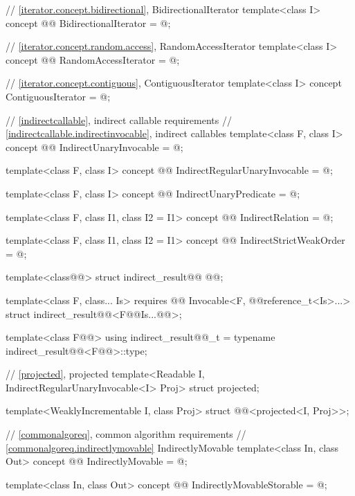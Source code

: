 \begin{addedblock}
\begin{codeblock}
  // \ref{iterator.concept.bidirectional}, BidirectionalIterator
  template<class I>
  concept @@ BidirectionalIterator = @\seebelownc@;

  // \ref{iterator.concept.random.access}, RandomAccessIterator
  template<class I>
  concept @@ RandomAccessIterator = @\seebelownc@;

  // \ref{iterator.concept.contiguous}, ContiguousIterator
  template<class I>
  concept ContiguousIterator = @\seebelownc@;

  // \ref{indirectcallable}, indirect callable requirements
  // \ref{indirectcallable.indirectinvocable}, indirect callables
  template<class F, class I>
  concept @@ IndirectUnaryInvocable = @\seebelownc@;

  template<class F, class I>
  concept @@ IndirectRegularUnaryInvocable = @\seebelownc@;

  template<class F, class I>
  concept @@ IndirectUnaryPredicate = @\seebelownc@;

  template<class F, class I1, class I2 = I1>
  concept @@ IndirectRelation = @\seebelownc@;

  template<class F, class I1, class I2 = I1>
  concept @@ IndirectStrictWeakOrder = @\seebelownc@;

  template<class@@>
  struct indirect_result@@ @\newtxt{\{ \}}@;

  template<class F, class... Is>
    requires @@ Invocable<F, @@reference_t<Is>...>
  struct indirect_result@@<F@\oldtxt{(}\newtxt{, }@Is...@\oldtxt{)}@>;

  template<class F@@>
  using indirect_result@@_t
    = typename indirect_result@@<F@@>::type;

  // \ref{projected}, projected
  template<Readable I, IndirectRegularUnaryInvocable<I> Proj>
  struct projected;

  template<WeaklyIncrementable I, class Proj>
  struct @@<projected<I, Proj>>;

  // \ref{commonalgoreq}, common algorithm requirements
  // \ref{commonalgoreq.indirectlymovable} IndirectlyMovable
  template<class In, class Out>
  concept @@ IndirectlyMovable = @\seebelownc@;

  template<class In, class Out>
  concept @@ IndirectlyMovableStorable = @\seebelownc@;


\end{codeblock}
\end{addedblock}

